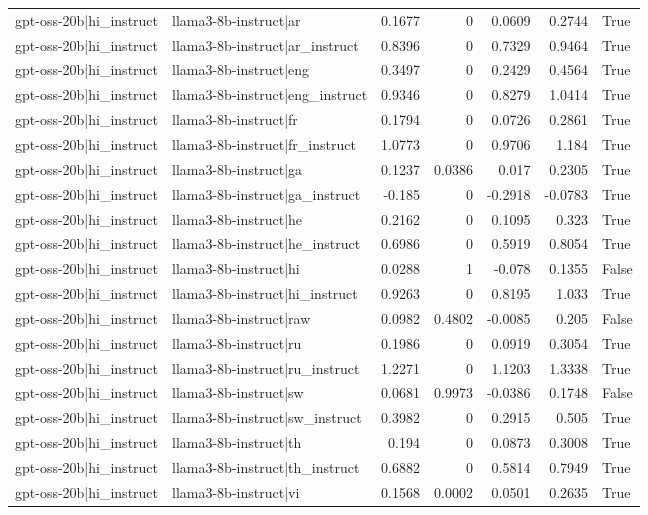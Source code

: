 \begin{table}
\begin{tabular}{l l r r r r l}
gpt-oss-20b|hi_instruct & llama3-8b-instruct|ar & 0.1677 & 0 & 0.0609 & 0.2744 & True \\
gpt-oss-20b|hi_instruct & llama3-8b-instruct|ar_instruct & 0.8396 & 0 & 0.7329 & 0.9464 & True \\
gpt-oss-20b|hi_instruct & llama3-8b-instruct|eng & 0.3497 & 0 & 0.2429 & 0.4564 & True \\
gpt-oss-20b|hi_instruct & llama3-8b-instruct|eng_instruct & 0.9346 & 0 & 0.8279 & 1.0414 & True \\
gpt-oss-20b|hi_instruct & llama3-8b-instruct|fr & 0.1794 & 0 & 0.0726 & 0.2861 & True \\
gpt-oss-20b|hi_instruct & llama3-8b-instruct|fr_instruct & 1.0773 & 0 & 0.9706 & 1.184 & True \\
gpt-oss-20b|hi_instruct & llama3-8b-instruct|ga & 0.1237 & 0.0386 & 0.017 & 0.2305 & True \\
gpt-oss-20b|hi_instruct & llama3-8b-instruct|ga_instruct & -0.185 & 0 & -0.2918 & -0.0783 & True \\
gpt-oss-20b|hi_instruct & llama3-8b-instruct|he & 0.2162 & 0 & 0.1095 & 0.323 & True \\
gpt-oss-20b|hi_instruct & llama3-8b-instruct|he_instruct & 0.6986 & 0 & 0.5919 & 0.8054 & True \\
gpt-oss-20b|hi_instruct & llama3-8b-instruct|hi & 0.0288 & 1 & -0.078 & 0.1355 & False \\
gpt-oss-20b|hi_instruct & llama3-8b-instruct|hi_instruct & 0.9263 & 0 & 0.8195 & 1.033 & True \\
gpt-oss-20b|hi_instruct & llama3-8b-instruct|raw & 0.0982 & 0.4802 & -0.0085 & 0.205 & False \\
gpt-oss-20b|hi_instruct & llama3-8b-instruct|ru & 0.1986 & 0 & 0.0919 & 0.3054 & True \\
gpt-oss-20b|hi_instruct & llama3-8b-instruct|ru_instruct & 1.2271 & 0 & 1.1203 & 1.3338 & True \\
gpt-oss-20b|hi_instruct & llama3-8b-instruct|sw & 0.0681 & 0.9973 & -0.0386 & 0.1748 & False \\
gpt-oss-20b|hi_instruct & llama3-8b-instruct|sw_instruct & 0.3982 & 0 & 0.2915 & 0.505 & True \\
gpt-oss-20b|hi_instruct & llama3-8b-instruct|th & 0.194 & 0 & 0.0873 & 0.3008 & True \\
gpt-oss-20b|hi_instruct & llama3-8b-instruct|th_instruct & 0.6882 & 0 & 0.5814 & 0.7949 & True \\
gpt-oss-20b|hi_instruct & llama3-8b-instruct|vi & 0.1568 & 0.0002 & 0.0501 & 0.2635 & True \\

\end{tabular}
\end{table}
